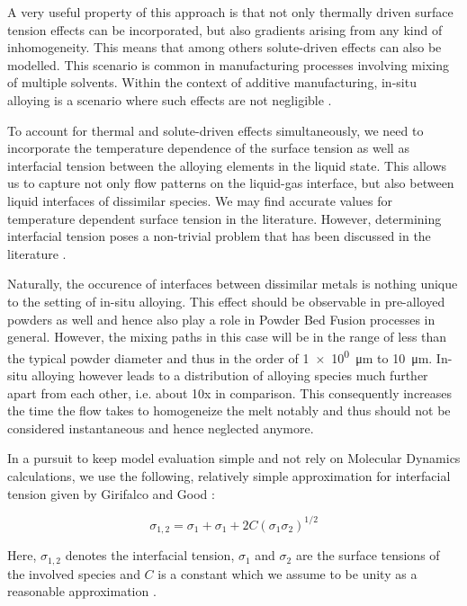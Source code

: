 \documentclass[conference,final]{IEEEtran}
\begin{document}
A very useful property of this approach is that not only thermally driven surface tension effects can be incorporated, but also gradients arising from any kind of inhomogeneity. This means that among others solute-driven effects can also be modelled. This scenario is common in manufacturing processes involving mixing of multiple solvents. Within the context of additive manufacturing, in-situ alloying is a scenario where such effects are not negligible \cite{katz-demyanetzInsituAlloyingNovel2020}.

To account for thermal and solute-driven effects simultaneously, we need to incorporate the temperature dependence of the surface tension as well as interfacial tension between the alloying elements in the liquid state. This allows us to capture not only flow patterns on the liquid-gas interface, but also between liquid interfaces of dissimilar species. We may find accurate values for temperature dependent surface tension in the literature. However, determining interfacial tension poses a non-trivial problem that has been discussed in the literature \cite{marmurCorrelatingInterfacialTensions2010}.

Naturally, the occurence of interfaces between dissimilar metals is nothing unique to the setting of in-situ alloying. This effect should be observable in pre-alloyed powders as well and hence also play a role in Powder Bed Fusion processes in general. However, the mixing paths in this case will be in the range of less than the typical powder diameter and thus in the order of \SI[per-mode=fraction]{1e0}{\micro\metre} to \SI[per-mode=fraction]{10}{\micro\metre}. In-situ alloying however leads to a distribution of alloying species much further apart from each other, i.e. about 10x in comparison. This consequently increases the time the flow takes to homogeneize the melt notably and thus should not be considered instantaneous and hence neglected anymore.

In a pursuit to keep model evaluation simple and not rely on Molecular Dynamics calculations, we use the following, relatively simple approximation for interfacial tension given by Girifalco and Good \cite{girifalcoTheoryEstimationSurface1957}:

\begin{equation}
    \sigma_{1,2} = \sigma_1 + \sigma_1 + 2C (\sigma_1 \sigma_2)^{1/2}
\end{equation}

Here, $\sigma_{1,2}$ denotes the interfacial tension, $\sigma_1$ and $\sigma_2$ are the surface tensions of the involved species and $C$ is a constant which we assume to be unity as a reasonable approximation \cite{marmurCorrelatingInterfacialTensions2010}.
\end{document}
